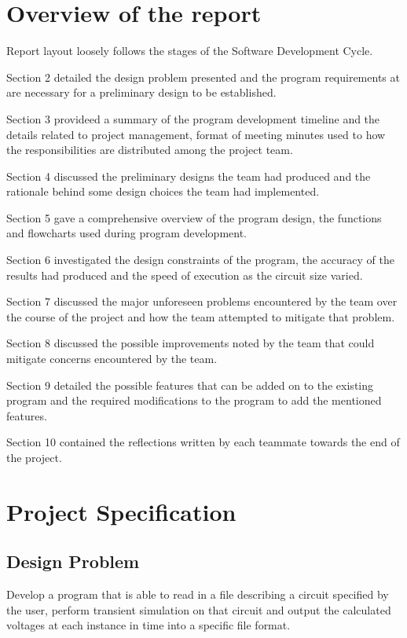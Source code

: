 \documentclass[12pt,a4paper]{article}
\begin{document}
\section{Overview of the report}
Report layout loosely follows the stages of the Software Development Cycle. \par
Section 2 detailed the design problem presented and the program requirements at are necessary for a preliminary design 
to be established. \par
Section 3 provideed a summary of the program development timeline and the details related to project management,
format of meeting minutes used to how the responsibilities are distributed among the project team. \par
Section 4 discussed the preliminary designs the team had produced and the rationale behind some design choices the team had 
implemented. \par
Section 5 gave a comprehensive overview of the program design, the functions and flowcharts used during program 
development. \par 
Section 6 investigated the design constraints of the program, the accuracy of the results had produced and the speed of 
execution as the circuit size varied.\par
Section 7 discussed the major unforeseen problems encountered by the team over the course of the project and 
how the team attempted to mitigate that problem. \par
Section 8 discussed the possible improvements noted by the team that could mitigate concerns encountered
by the team. \par
Section 9 detailed the possible features that can be added on to the existing program and the required modifications to the
program to add the mentioned features. \par 
Section 10 contained the reflections written by each teammate towards the end of the project. \par
\pagebreak

\section{Project Specification}
	\subsection{Design Problem}
	Develop a program that is able to read in a file describing a circuit specified by the user, perform 
	transient simulation on that circuit and output the calculated voltages at each instance in time into a specific file
	format. 
\end{document}
